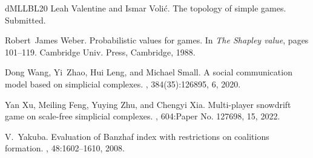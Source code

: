 \documentclass[11pt]{amsart}
\theoremstyle{plain}
\theoremstyle{definition}
\theoremstyle{remark}
\begin{document}
\begin{thebibliography}{dMLLBL20}
Leah Valentine and Ismar Voli\'c.
\newblock The topology of simple games.
\newblock Submitted.

Robert~James Weber.
\newblock Probabilistic values for games.
\newblock In {\em The {S}hapley value}, pages 101--119. Cambridge Univ. Press,
  Cambridge, 1988.

Dong Wang, Yi~Zhao, Hui Leng, and Michael Small.
\newblock A social communication model based on simplicial complexes.
, 384(35):126895, 6, 2020.

Yan Xu, Meiling Feng, Yuying Zhu, and Chengyi Xia.
\newblock Multi-player snowdrift game on scale-free simplicial complexes.
, 604:Paper No. 127698, 15, 2022.

V.~Yakuba.
\newblock Evaluation of {B}anzhaf index with restrictions on coalitions
  formation.
, 48:1602--1610, 2008.

\end{thebibliography}


\end{document}
